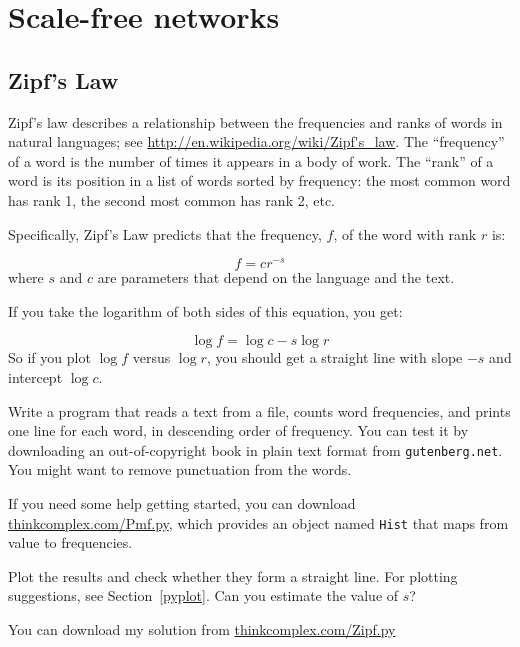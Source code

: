 \documentclass[10pt]{book}
\begin{document}
\chapter{Scale-free networks}
\label{scale-free}

\section{Zipf's Law}

Zipf's law describes a relationship between the frequencies and ranks
of words in natural languages; see
  \url{http://en.wikipedia.org/wiki/Zipf's_law}.  The ``frequency'' of
a word is the number of times it appears in a body of work.
The ``rank'' of a word is its position in a list of words
sorted by frequency: the most common word has rank 1, the
second most common has rank 2, etc.

Specifically, Zipf's Law
predicts that the frequency, $f$, of the word with rank $r$ is:

\[ f = c r^{-s} \]
%
where $s$ and $c$ are parameters that depend on the language and the
text.

If you take the logarithm of both sides of this equation, you get:


\[ \log f = \log c - s \log r \]
%
So if you plot $\log f$ versus $\log r$, you should get
a straight line with slope $-s$ and intercept $\log c$.

\begin{exercise}

Write a program that reads a text from a file, counts word
frequencies, and prints one line for each word, in descending order of
frequency.  You can test it by downloading an out-of-copyright book in
plain text format from {\tt gutenberg.net}.  You might want to remove
punctuation from the words.

If you need some help getting started, you can download
\url{thinkcomplex.com/Pmf.py}, which provides an
object named {\tt Hist} that maps from value to frequencies.

Plot the results and check whether they form
a straight line.  For plotting suggestions, see Section~\ref{pyplot}.
Can you estimate the value of $s$?

You can download my solution from
\url{thinkcomplex.com/Zipf.py}

\end{exercise}
\end{document}
